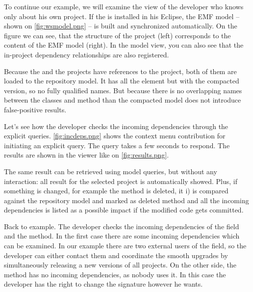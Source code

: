 To continue our example, we will examine the view of the developer who knows
only about his own  project. If the \ptool{} is  installed in his
Eclipse, the EMF model -- shown on \autoref{fig:wsmodel.png}
-- is built and synchronized automatically. On the figure we can see, that the
structure of the project (left) corresponds to the content of the EMF model
(right). In the model view, you can also see that the in-project dependency
relationships are also registered.


Because the  and the  projects have references to the
 project, both of them are loaded to the repository model. It has all the
element but with the compacted version, so no fully qualified names. But because
there is no overlapping names between the classes and method than the compacted
model does not introduce false-positive results.

Let's see how the developer checks the incoming dependencies through the
explicit queries.
\autoref{fig:incdeps.png} shows the context menu contribution for initiating an
explicit query. The query takes a few seconds to respond. The results are shown
in the viewer like on \autoref{fig:results.png}.
 
The same result can be retrieved using model queries, but without any
interaction: all result for the selected project is automatically showed. Plus,
if something is changed, for example the  method is deleted, it
i) is compared against the repository model and marked as deleted method and all
the incoming dependencies is listed as a possible impact if the modified code
gets committed. 

Back to example. The developer checks the incoming dependencies of the
\mbox{} \mbox{} field and the 
method. In the first case there are some incoming dependencies which can be
examined.
In our example there are two external users of the field, so the developer can
either contact them and coordinate the smooth upgrades by simultaneously
releasing a new versions of all projects. On the other side, the
 method has no incoming dependencies, as nobody uses it. In
this case the developer has the right to change the signature however he wants.


